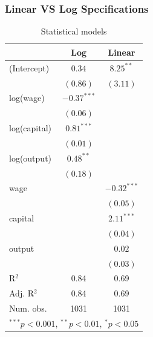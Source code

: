 \documentclass{beamer}
\newcommand{\1}{\mathbb{1}}
\begin{document}
\begin{frame}\frametitle{Linear VS Log Specifications}
\begin{table}
\footnotesize
\begin{center}
\begin{tabular}{l c c }
\hline
 & Log & Linear \\
\hline
(Intercept)  & $0.34$        & $8.25^{**}$   \\
             & $(0.86)$      & $(3.11)$      \\
log(wage)    & $-0.37^{***}$ &               \\
             & $(0.06)$      &               \\
log(capital) & $0.81^{***}$  &               \\
             & $(0.01)$      &               \\
log(output)  & $0.48^{**}$   &               \\
             & $(0.18)$      &               \\
wage         &               & $-0.32^{***}$ \\
             &               & $(0.05)$      \\
capital      &               & $2.11^{***}$  \\
             &               & $(0.04)$      \\
output       &               & $0.02$        \\
             &               & $(0.03)$      \\
\hline
R$^2$        & 0.84          & 0.69          \\
Adj. R$^2$   & 0.84          & 0.69          \\
Num. obs.    & 1031          & 1031          \\
\hline
\multicolumn{3}{l}{\scriptsize{$^{***}p<0.001$, $^{**}p<0.01$, $^*p<0.05$}}
\end{tabular}
\caption{Statistical models}
\label{table:coefficients}
\end{center}
\end{table}
\end{frame}
\end{document}
